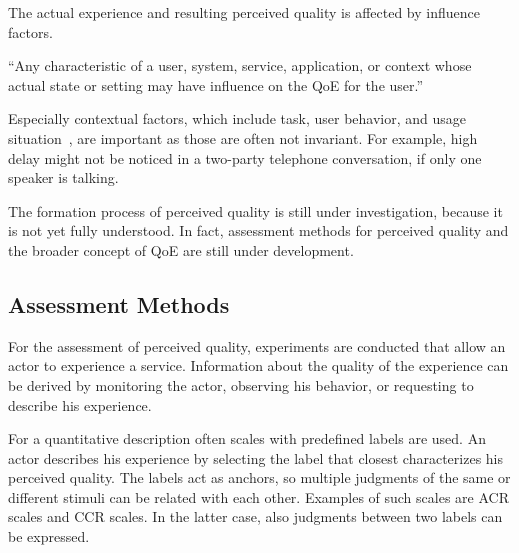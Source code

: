 The actual experience and resulting perceived quality is affected by influence factors.
\begin{definition}
``Any characteristic of a user, system, service, application, or context whose actual state or setting may have influence on the \ac{QoE} for the user.''~\citep[][p.~56]{reiter_quality_2014}
\end{definition}
Especially contextual factors, which include task, user behavior, and usage situation~\citep[][p.~56]{reiter_quality_2014}, are important as those are often not invariant.
For example, high delay might not be noticed in a two-party telephone conversation, if only one speaker is talking.

The formation process of perceived quality is still under investigation, because it is not yet fully understood.
In fact, assessment methods for perceived quality and the broader concept of \ac{QoE} are still under development.

\subsection{Assessment Methods}
For the assessment of perceived quality, experiments are conducted that allow an actor to experience a service.
Information about the quality of the experience can be derived by monitoring the actor, observing his behavior, or requesting to describe his experience.

For a quantitative description often scales with predefined labels are used.
An actor describes his experience by selecting the label that closest characterizes his perceived quality.
The labels act as anchors, so multiple judgments of the same or different stimuli can be related with each other.
Examples of such scales are \acf{ACR} scales and \acf{CCR} scales.
In the latter case, also judgments between two labels can be expressed.


